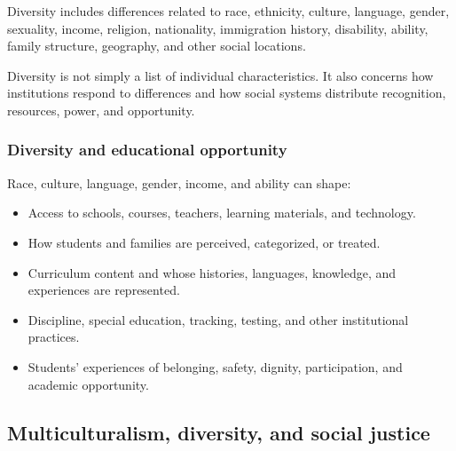 \documentclass[
  letterpaper,
  DIV=11,
  numbers=noendperiod]{scrartcl}
\providecommand{\tightlist}{%
  \setlength{\itemsep}{0pt}\setlength{\parskip}{0pt}}\usepackage{longtable,booktabs,array}
\begin{document}
\begin{tcolorbox}[enhanced jigsaw, colframe=quarto-callout-tip-color-frame, rightrule=.15mm, opacitybacktitle=0.6, leftrule=.75mm, colback=white, breakable, coltitle=black, arc=.35mm, bottomrule=.15mm, titlerule=0mm, left=2mm, colbacktitle=quarto-callout-tip-color!10!white, title=\textcolor{quarto-callout-tip-color}{\faLightbulb}\hspace{0.5em}{Diversity}, toprule=.15mm, bottomtitle=1mm, toptitle=1mm, opacityback=0]

Diversity includes differences related to race, ethnicity, culture,
language, gender, sexuality, income, religion, nationality, immigration
history, disability, ability, family structure, geography, and other
social locations.

Diversity is not simply a list of individual characteristics. It also
concerns how institutions respond to differences and how social systems
distribute recognition, resources, power, and opportunity.

\end{tcolorbox}

\subsubsection{Diversity and educational
opportunity}\label{diversity-and-educational-opportunity}

Race, culture, language, gender, income, and ability can shape:

\begin{itemize}
\tightlist
\item
  Access to schools, courses, teachers, learning materials, and
  technology.
\item
  How students and families are perceived, categorized, or treated.
\item
  Curriculum content and whose histories, languages, knowledge, and
  experiences are represented.
\item
  Discipline, special education, tracking, testing, and other
  institutional practices.
\item
  Students' experiences of belonging, safety, dignity, participation,
  and academic opportunity.
\end{itemize}

\subsection{Multiculturalism, diversity, and social
justice}\label{multiculturalism-diversity-and-social-justice}
\end{document}
